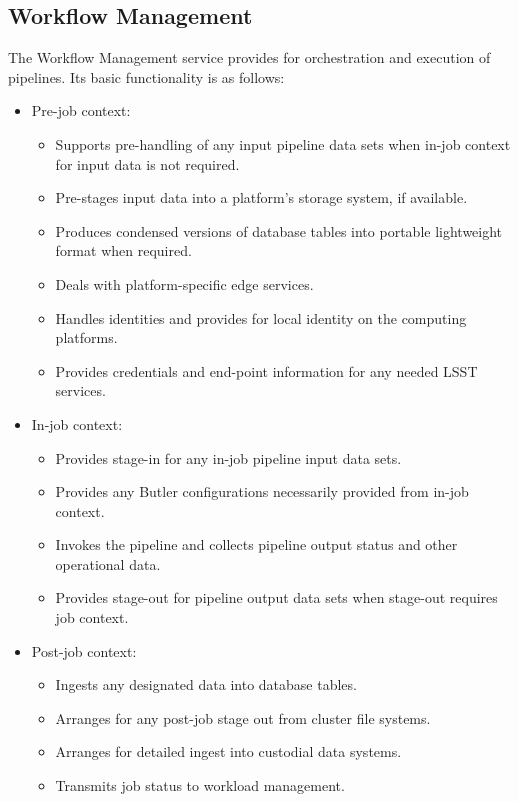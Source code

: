 \documentclass[DM,toc]{lsstdoc}
\begin{document}
\subsection{Workflow Management}\label{workflow-management}

The Workflow Management service provides for orchestration and execution of
pipelines.  Its basic functionality is as follows:
\begin{itemize}
	\item Pre-job context:
		\begin{itemize}
			\item Supports pre-handling of any input pipeline data sets when in-job context for input data is not required.
			\item Pre-stages input data into a platform’s storage system, if available.
			\item Produces condensed versions of database tables into portable lightweight format when required.
			\item Deals with platform-specific edge services.
			\item Handles identities and provides for local identity on the computing platforms.
			\item Provides credentials and end-point information for any needed LSST services.
		\end{itemize}
	\item In-job context:
		\begin{itemize}
			\item Provides stage-in for any in-job pipeline input data sets.
			\item Provides any Butler configurations necessarily provided from in-job context.
			\item Invokes the pipeline and collects pipeline output status and other operational data.
			\item Provides stage-out for pipeline output data sets when stage-out requires job context.
		\end{itemize}
	\item Post-job context:
		\begin{itemize}
			\item Ingests any designated data into database tables.
			\item Arranges for any post-job stage out from cluster file systems.
			\item Arranges for detailed ingest into custodial data systems.
			\item Transmits job status to workload management.
		\end{itemize}
\end{itemize}
\end{document}
